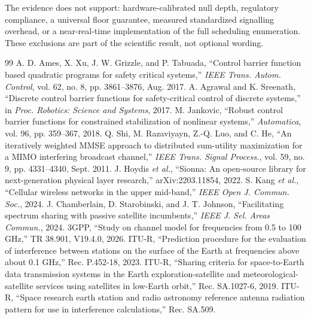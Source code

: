 \documentclass[journal]{IEEEtran}
\begin{document}
The evidence does not support: hardware-calibrated null depth, regulatory compliance, a universal floor guarantee, measured standardized signalling overhead, or a near-real-time implementation of the full scheduling enumeration. These exclusions are part of the scientific result, not optional wording.

\begin{thebibliography}{99}
A. D. Ames, X. Xu, J. W. Grizzle, and P. Tabuada, ``Control barrier function based quadratic programs for safety critical systems,'' \emph{IEEE Trans. Autom. Control}, vol. 62, no. 8, pp. 3861--3876, Aug. 2017.
A. Agrawal and K. Sreenath, ``Discrete control barrier functions for safety-critical control of discrete systems,'' in \emph{Proc. Robotics: Science and Systems}, 2017.
M. Jankovic, ``Robust control barrier functions for constrained stabilization of nonlinear systems,'' \emph{Automatica}, vol. 96, pp. 359--367, 2018.
Q. Shi, M. Razaviyayn, Z.-Q. Luo, and C. He, ``An iteratively weighted MMSE approach to distributed sum-utility maximization for a MIMO interfering broadcast channel,'' \emph{IEEE Trans. Signal Process.}, vol. 59, no. 9, pp. 4331--4340, Sept. 2011.
J. Hoydis \emph{et al.}, ``Sionna: An open-source library for next-generation physical layer research,'' arXiv:2203.11854, 2022.
S. Kang \emph{et al.}, ``Cellular wireless networks in the upper mid-band,'' \emph{IEEE Open J. Commun. Soc.}, 2024.
J. Chamberlain, D. Starobinski, and J. T. Johnson, ``Facilitating spectrum sharing with passive satellite incumbents,'' \emph{IEEE J. Sel. Areas Commun.}, 2024.
3GPP, ``Study on channel model for frequencies from 0.5 to 100 GHz,'' TR 38.901, V19.4.0, 2026.
ITU-R, ``Prediction procedure for the evaluation of interference between stations on the surface of the Earth at frequencies above about 0.1 GHz,'' Rec. P.452-18, 2023.
ITU-R, ``Sharing criteria for space-to-Earth data transmission systems in the Earth exploration-satellite and meteorological-satellite services using satellites in low-Earth orbit,'' Rec. SA.1027-6, 2019.
ITU-R, ``Space research earth station and radio astronomy reference antenna radiation pattern for use in interference calculations,'' Rec. SA.509.
\end{thebibliography}
\end{document}

